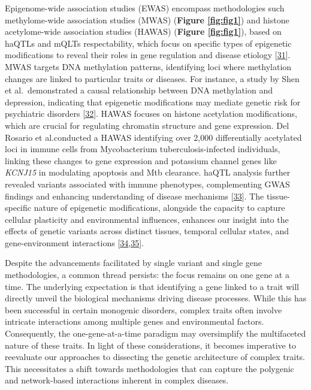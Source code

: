 Epigenome-wide association studies (EWAS) encompass methodologies such methylome-wide association studies (MWAS) (\textbf{Figure \ref{fig:fig1}}) and histone acetylome-wide association studies (HAWAS) (\textbf{Figure \ref{fig:fig1}}), based on haQTLs and mQLTs respectability, which focus on specific types of epigenetic modifications to reveal their roles in gene regulation and disease etiology {[}\protect\hyperlink{ref-TPqvAJda}{31}{]}.
MWAS targets DNA methylation patterns, identifying loci where methylation changes are linked to particular traits or diseases.
For instance, a study by Shen et al.~demonstrated a causal relationship between DNA methylation and depression, indicating that epigenetic modifications may mediate genetic risk for psychiatric disorders {[}\protect\hyperlink{ref-1DNxNkLsT}{32}{]}.
HAWAS focuses on histone acetylation modifications, which are crucial for regulating chromatin structure and gene expression.
Del Rosario et al.conducted a HAWAS identifying over 2,000 differentially acetylated loci in immune cells from Mycobacterium tuberculosis-infected individuals, linking these changes to gene expression and potassium channel genes like \emph{KCNJ15} in modulating apoptosis and Mtb clearance.
haQTL analysis further revealed variants associated with immune phenotypes, complementing GWAS findings and enhancing understanding of disease mechanisms {[}\protect\hyperlink{ref-1BYHeZlgB}{33}{]}.
The tissue-specific nature of epigenetic modifications, alongside the capacity to capture cellular plasticity and environmental influences, enhances our insight into the effects of genetic variants across distinct tissues, temporal cellular states, and gene-environment interactions {[}\protect\hyperlink{ref-FeaSnwhX}{34},\protect\hyperlink{ref-KfWCLspO}{35}{]}.

Despite the advancements facilitated by single variant and single gene methodologies, a common thread persists: the focus remains on one gene at a time.
The underlying expectation is that identifying a gene linked to a trait will directly unveil the biological mechanisms driving disease processes.
While this has been successful in certain monogenic disorders, complex traits often involve intricate interactions among multiple genes and environmental factors.
Consequently, the one-gene-at-a-time paradigm may oversimplify the multifaceted nature of these traits.
In light of these considerations, it becomes imperative to reevaluate our approaches to dissecting the genetic architecture of complex traits.
This necessitates a shift towards methodologies that can capture the polygenic and network-based interactions inherent in complex diseases.

